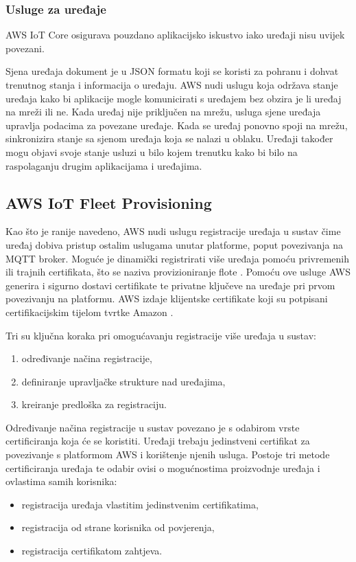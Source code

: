 \subsubsection{Usluge za uređaje}

AWS IoT Core osigurava pouzdano aplikacijsko iskustvo iako uređaji nisu uvijek povezani. 

Sjena uređaja  dokument je u JSON formatu koji se koristi za pohranu i dohvat trenutnog stanja i informacija o uređaju. AWS nudi uslugu koja održava stanje uređaja  kako bi aplikacije mogle komunicirati s uređajem bez obzira je li uređaj na mreži ili ne. Kada uređaj nije priključen na mrežu, usluga sjene uređaja upravlja podacima za povezane uređaje. Kada se uređaj ponovno spoji na mrežu, sinkronizira stanje sa sjenom uređaja koja se nalazi u oblaku. Uređaji također mogu objavi svoje stanje usluzi u bilo kojem trenutku kako bi bilo na raspolaganju drugim aplikacijama i uređajima. 

\subsection{AWS IoT Fleet Provisioning}

Kao što je ranije navedeno, AWS nudi uslugu registracije uređaja u sustav čime uređaj dobiva pristup ostalim uslugama unutar platforme, poput povezivanja na MQTT broker. Moguće je dinamički registrirati više uređaja pomoću privremenih ili trajnih certifikata, što se naziva provizioniranje flote . Pomoću ove usluge AWS generira i sigurno dostavi certifikate te privatne ključeve na uređaje pri prvom povezivanju na platformu. AWS izdaje klijentske certifikate koji su potpisani certifikacijskim tijelom tvrtke Amazon  \cite{aws_docs}.

Tri su ključna koraka pri omogućavanju registracije više uređaja u sustav:
\begin{enumerate}
	\item određivanje načina registracije,
	\item definiranje upravljačke strukture nad uređajima,
	\item kreiranje predloška za registraciju.
\end{enumerate}

Određivanje načina registracije u sustav povezano je s odabirom vrste certificiranja koja će se koristiti. Uređaji trebaju jedinstveni certifikat za povezivanje s platformom AWS i korištenje njenih usluga. Postoje tri metode certificiranja uređaja te odabir ovisi o mogućnostima proizvodnje uređaja i ovlastima samih korisnika:
\begin{itemize}
	\item registracija uređaja vlastitim jedinstvenim certifikatima, 
	\item registracija od strane korisnika od povjerenja,
	\item registracija certifikatom zahtjeva.  
\end{itemize} 

